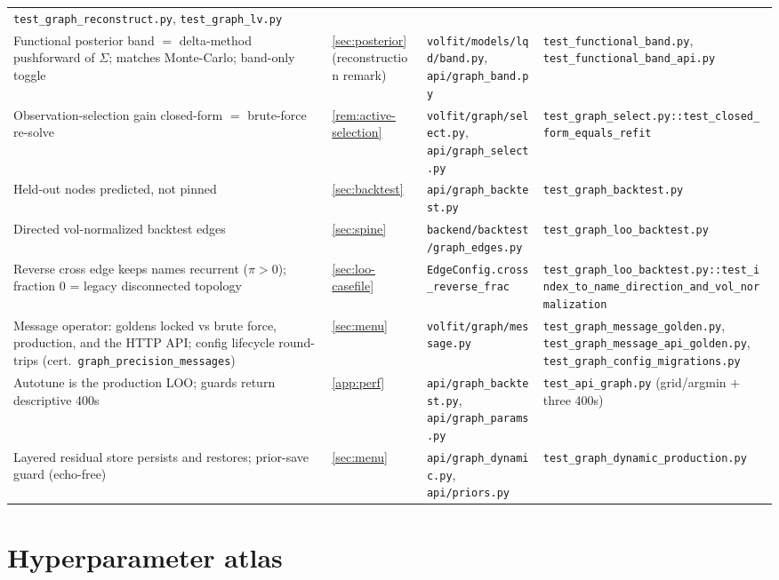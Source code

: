 \documentclass[11pt]{article}
\begin{document}
\begin{longtable}{@{}p{}p{}p{}p{}@{}}
\nolinkurl{test_graph_reconstruct.py}, \nolinkurl{test_graph_lv.py}\\
Functional posterior band $=$ delta-method pushforward of $\Sigma$; matches
Monte-Carlo; band-only toggle &
\cref{sec:posterior} (reconstruction remark) &
\nolinkurl{volfit/models/lqd/band.py}, \nolinkurl{api/graph_band.py} &
\nolinkurl{test_functional_band.py}, \nolinkurl{test_functional_band_api.py}\\
Observation-selection gain closed-form $=$ brute-force re-solve &
\cref{rem:active-selection} &
\nolinkurl{volfit/graph/select.py}, \nolinkurl{api/graph_select.py} &
\nolinkurl{test_graph_select.py::test_closed_form_equals_refit}\\
Held-out nodes predicted, not pinned &
\cref{sec:backtest} &
\nolinkurl{api/graph_backtest.py} &
\nolinkurl{test_graph_backtest.py}\\
Directed vol-normalized backtest edges &
\cref{sec:spine} &
\nolinkurl{backend/backtest/graph_edges.py} &
\nolinkurl{test_graph_loo_backtest.py}\\
Reverse cross edge keeps names recurrent ($\pi>0$); fraction $0$ = legacy
disconnected topology &
\cref{sec:loo-casefile} &
\nolinkurl{EdgeConfig.cross_reverse_frac} &
\nolinkurl{test_graph_loo_backtest.py::test_index_to_name_direction_and_vol_normalization}\\
\addlinespace
Message operator: goldens locked vs brute force, production, and the HTTP
API; config lifecycle round-trips (cert.\
\texttt{graph\_precision\_messages}) &
\cref{sec:menu} &
\nolinkurl{volfit/graph/message.py} &
\nolinkurl{test_graph_message_golden.py},
\nolinkurl{test_graph_message_api_golden.py},
\nolinkurl{test_graph_config_migrations.py}\\
Autotune is the production LOO; guards return descriptive 400s &
\cref{app:perf} &
\nolinkurl{api/graph_backtest.py}, \nolinkurl{api/graph_params.py} &
\nolinkurl{test_api_graph.py} (grid/argmin $+$ three 400s)\\
Layered residual store persists and restores; prior-save guard (echo-free) &
\cref{sec:menu} &
\nolinkurl{api/graph_dynamic.py}, \nolinkurl{api/priors.py} &
\nolinkurl{test_graph_dynamic_production.py}\\
\bottomrule
\end{longtable}
\endgroup

\appendix
\section{Hyperparameter atlas}
\label{app:atlas}
\end{document}
